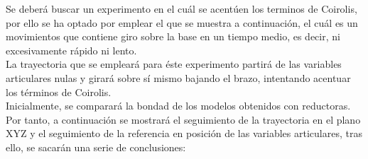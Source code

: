 Se deberá buscar un experimento en el cuál se acentúen los terminos de Coirolis, por ello se ha optado por emplear el que se muestra a continuación, el cuál es un movimientos que contiene giro sobre la base en un tiempo medio, es decir, ni excesivamente rápido ni lento. \\
La trayectoria que se empleará para éste experimento partirá de las variables articulares nulas y girará sobre sí mismo bajando el brazo, intentando acentuar los términos de Coirolis.\\

Inicialmente, se comparará la bondad de los modelos obtenidos con reductoras. Por tanto, a continuación se mostrará el seguimiento de la trayectoria en el plano XYZ y el seguimiento de la referencia en posición de las variables articulares, tras ello, se sacarán una serie de conclusiones:
